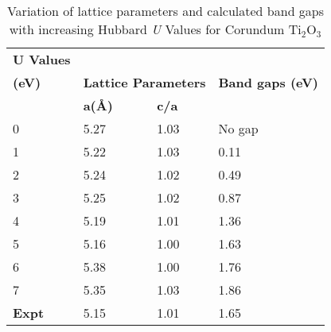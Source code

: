 \documentclass[aps,prb,superscriptaddress,twocolumn,floatfix,showpacs,amsmath]{revtex4-1}
\begin{document}
\begin{table}[h]
\begin{tabular}{llll} \hline\hline
\textbf{ U Values }\\\textbf{(eV)} & \multicolumn{2}{l}{ \textbf{Lattice Parameters}}  & {\textbf{Band gaps (eV)} } \\ &\textbf{a(Å)} & {\textbf{c/a } }             &   \\
            \hline\hline  
0   & 5.27       & 1.03         & No gap                  \\
1   & 5.22       & 1.03          & 0.11                  \\
2   & 5.24      & 1.02           & 0.49                 \\
3   & 5.25      & 1.02           & 0.87                 \\
4   & 5.19     & 1.01            & 1.36                  \\
5   & 5.16     & 1.00            &1.63                    \\
6   & 5.38     & 1.00            & 1.76                 \\
7   & 5.35     & 1.03            & 1.86               \\
\textbf{Expt}\cite{li2018titanium}    & 5.15                                               & 1.01  & 1.65                       \\ \hline\hline                   
\end{tabular}
\caption{Variation of  lattice parameters and calculated band gaps with increasing Hubbard \textit{U} Values for Corundum Ti$_{2}$O$_{3}$} 
\label{tab:table 1}
\end{table}
\end{document}
